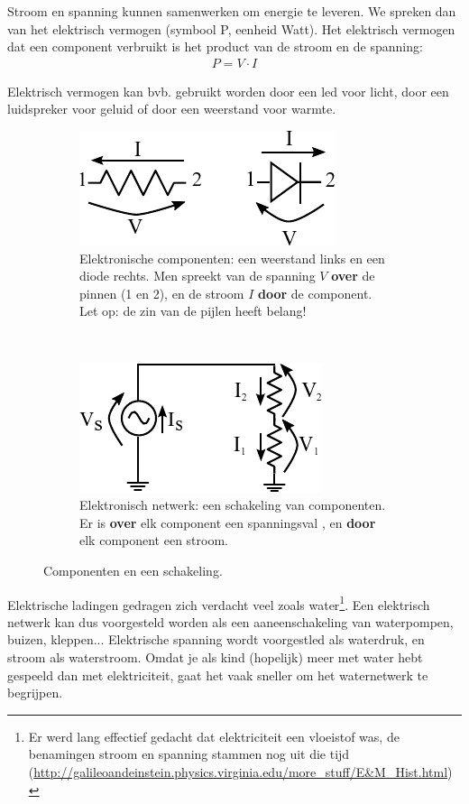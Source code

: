 \documentclass{article}
\begin{document}
		Stroom en spanning kunnen samenwerken om energie te leveren. We spreken dan van het elektrisch vermogen (symbool P, eenheid Watt). Het elektrisch vermogen dat een component verbruikt is het product van de stroom en de spanning:
		\begin{align}
		     P = V \cdot I
		     \label{eq:vermogen}
		 \end{align} 

		Elektrisch vermogen kan bvb. gebruikt worden door een led voor licht, door een luidspreker voor geluid of door een weerstand voor warmte.

		\begin{figure}[hbtp]
			\centering
			\begin{subfigure}[b]{0.4\linewidth}
				\centering
				\includegraphics{componenten}
				\caption{Elektronische componenten: een weerstand links en een diode rechts. Men spreekt van de spanning $V$ \textbf{over} de pinnen (1 en 2), en de stroom $I$ \textbf{door} de component. Let op: de zin van de pijlen heeft belang!}
				\label{subfig:componenten}
			\end{subfigure}
			~
			\begin{subfigure}[b]{0.4\linewidth}
				\centering
				\includegraphics{weerstandsdeler}
				\caption{Elektronisch netwerk: een schakeling van componenten. Er is \textbf{over} elk component een spanningsval , en \textbf{door} elk component een stroom.}
				\label{subfig:netwerk}
			\end{subfigure}
			\caption{Componenten en een schakeling. }
			\label{fig:component_en_schakeling}
		\end{figure}

		 Elektrische ladingen gedragen zich verdacht veel zoals water\footnote{Er werd lang effectief gedacht dat elektriciteit een vloeistof was, de benamingen stroom en spanning stammen nog uit die tijd (\url{http://galileoandeinstein.physics.virginia.edu/more_stuff/E&M_Hist.html})}.
		Een elektrisch netwerk kan dus voorgesteld worden als een aaneenschakeling van waterpompen, buizen, kleppen... Elektrische spanning wordt voorgestled als waterdruk, en stroom als waterstroom. Omdat je als kind (hopelijk) meer met water hebt gespeeld dan met elektriciteit, gaat het vaak sneller om het waternetwerk te begrijpen.
\end{document}

